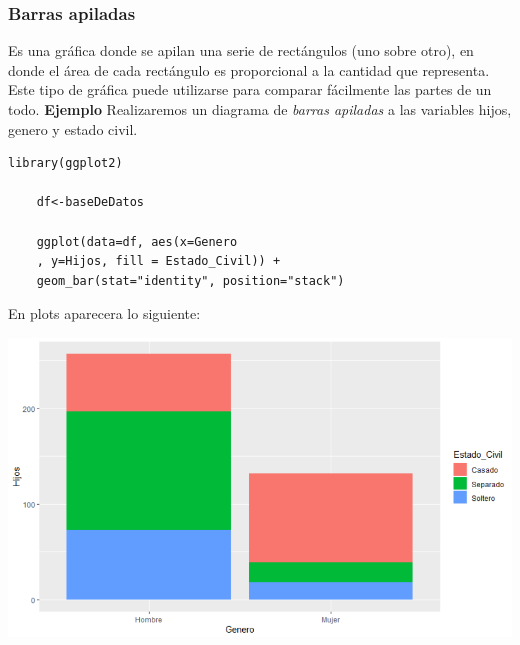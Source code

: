 \documentclass[12pt,hidelinks]{article}
\begin{document}
	\subsubsection{Barras apiladas}
	Es una gráfica donde se apilan una serie de rectángulos (uno sobre otro), en donde el área de cada rectángulo es proporcional a la cantidad que representa. Este tipo de gráfica puede utilizarse para comparar fácilmente las partes de un todo. \textbf{Ejemplo} Realizaremos un diagrama de \textit{barras apiladas} a las variables hijos, genero y estado civil.
	\begin{lstlisting}[frame=single]
	library(ggplot2)
	
	df<-baseDeDatos
	
	ggplot(data=df, aes(x=Genero
	, y=Hijos, fill = Estado_Civil)) + 
	geom_bar(stat="identity", position="stack")
	\end{lstlisting}
	En plots aparecera lo siguiente:
	\begin{center}
		\includegraphics[width = 14cm]{images/2/GraficaBarrasA.PNG}
	\end{center}
	
\end{document}
